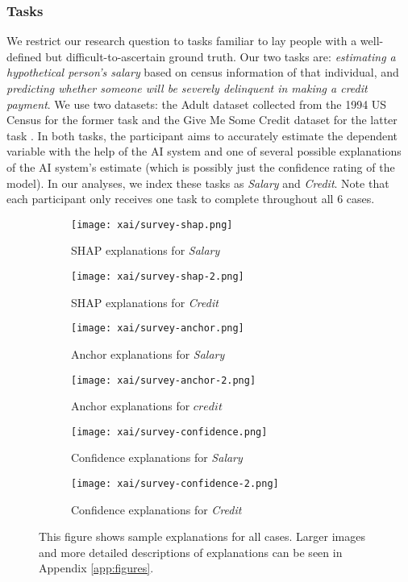 \subsubsection{Tasks}
We restrict our research question to tasks familiar to lay people with a well-defined but difficult-to-ascertain ground truth. Our two tasks are: \emph{estimating a hypothetical person's salary} based on census information of that individual, and \emph{predicting whether someone will be severely delinquent in making a credit payment}. We use two datasets: the Adult dataset collected from the 1994 US Census for the former task and the Give Me Some Credit dataset for the latter task \cite{Kohavi, GiveMeSomeCredit}. In both tasks, the participant aims to accurately estimate the dependent variable with the help of the AI system and one of several possible explanations of the AI system's estimate (which is possibly just the confidence rating of the model). In our analyses, we index these tasks as \emph{Salary} and \emph{Credit}. Note that each participant only receives one task to complete throughout all 6 cases. 

\begin{figure}[htbp]
    \centering
    \begin{subfigure}[b]{0.45\textwidth}
        \texttt{[image: xai/survey-shap.png]}
        \caption{SHAP explanations for \emph{Salary}}
        \label{fig:shapsalary}
    \end{subfigure}
    \hfill
    \begin{subfigure}[b]{0.45\textwidth}
        \texttt{[image: xai/survey-shap-2.png]}
        \caption{SHAP explanations for \emph{Credit}}
        \label{fig:shapcredit}
    \end{subfigure}
    \medskip
    \begin{subfigure}[b]{0.45\textwidth}
        \texttt{[image: xai/survey-anchor.png]}
        \caption{Anchor explanations for \emph{Salary}}
        \label{fig:anchorsalary}
    \end{subfigure}
    \hfill
    \begin{subfigure}[b]{0.45\textwidth}
        \texttt{[image: xai/survey-anchor-2.png]}
        \caption{Anchor explanations for $credit$}
        \label{fig:anchorcredit}
    \end{subfigure}
    \medskip
    \begin{subfigure}[b]{0.45\textwidth}
        \texttt{[image: xai/survey-confidence.png]}
        \caption{Confidence explanations for \emph{Salary}}
        \label{fig:confidencesalary}
    \end{subfigure}
    \hfill
    \begin{subfigure}[b]{0.45\textwidth}
        \texttt{[image: xai/survey-confidence-2.png]}
        \caption{Confidence explanations for \emph{Credit}}
        \label{fig:confidencecredit}
    \end{subfigure}
    \caption{This figure shows sample explanations for all cases. Larger images and more detailed descriptions of explanations can be seen in Appendix \ref{app:figures}.}
    \label{fig:online_explanations}
\end{figure}


